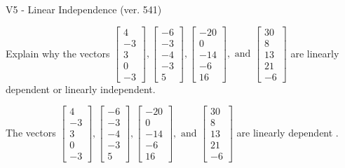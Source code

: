 \begin{exercise}
  \begin{exerciseTitle}V5 - Linear Independence (ver. 541)\end{exerciseTitle}
  \begin{exerciseStatement}
    Explain why the vectors \(\left[\begin{array}{r}
4 \\
-3 \\
3 \\
0 \\
-3
\end{array}\right] , \left[\begin{array}{r}
-6 \\
-3 \\
-4 \\
-3 \\
5
\end{array}\right] , \left[\begin{array}{r}
-20 \\
0 \\
-14 \\
-6 \\
16
\end{array}\right] , \text{ and } \left[\begin{array}{r}
30 \\
8 \\
13 \\
21 \\
-6
\end{array}\right]\) are linearly dependent or linearly independent.	


  \end{exerciseStatement}
  \begin{exerciseAnswer}
   The vectors \(\left[\begin{array}{r}
4 \\
-3 \\
3 \\
0 \\
-3
\end{array}\right] , \left[\begin{array}{r}
-6 \\
-3 \\
-4 \\
-3 \\
5
\end{array}\right] , \left[\begin{array}{r}
-20 \\
0 \\
-14 \\
-6 \\
16
\end{array}\right] , \text{ and } \left[\begin{array}{r}
30 \\
8 \\
13 \\
21 \\
-6
\end{array}\right]\) are 
  	 linearly dependent  .
  


  \end{exerciseAnswer}
\end{exercise}